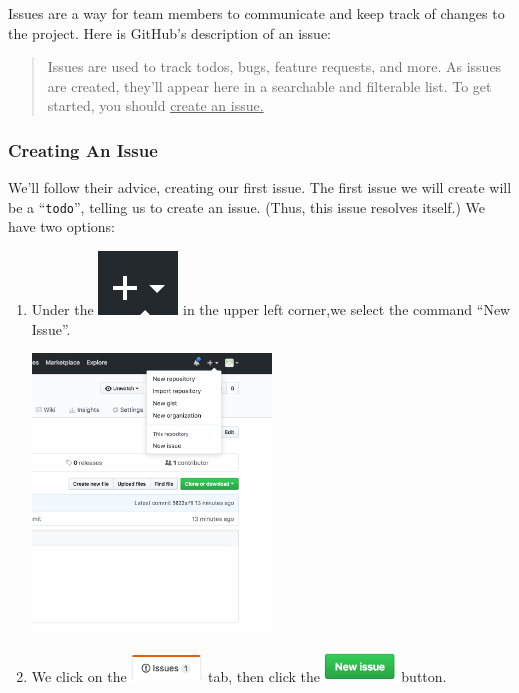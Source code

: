 \documentclass[11pt]{article}
\begin{document}
Issues are a way for team members to communicate and keep track of changes to the project.  Here is GitHub's description of an issue:~\cite{github-issues} \\

\begin{quote}
Issues are used to track todos, bugs, feature requests, and more. As issues are created, they'll appear here in a searchable and filterable list. To get started, you should \underline{create an issue.}
\end{quote} 

\subsubsection{Creating An Issue}
We'll follow their advice, creating our first issue. The first issue we will create will be a ``\texttt{todo}'', telling us to create an issue. (Thus, this issue resolves itself.) We have two options: 

\begin{enumerate}

\item Under the \includegraphics{PlusMenu}
 in the upper left corner,we select the command ``New Issue''. \\

\begin{center}
\includegraphics[width=0.5\textwidth]{NewIssueMenu}
\end{center}

\item We click on the \includegraphics[width=0.75in]{IssuesLink} tab, then click the \includegraphics[width=0.75in]{NewIssueButton} button. 

\end{enumerate} 
\end{document}
